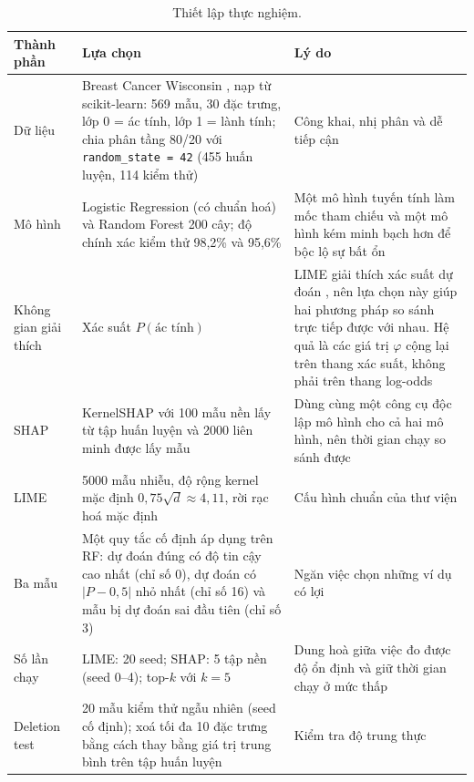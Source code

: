 \documentclass[11pt,a4paper]{article}
\newcommand{\code}[1]{\texttt{#1}}
\begin{document}
\begin{table}[!htb]
\centering\small
\caption{Thiết lập thực nghiệm.}\label{tab:setup}
\begin{tabularx}{\textwidth}{L{2.4cm}XL{3.8cm}}
\toprule
\textbf{Thành phần} & \textbf{Lựa chọn} & \textbf{Lý do}\\
\midrule
Dữ liệu & Breast Cancer Wisconsin \cite{street}, nạp từ scikit-learn: 569 mẫu, 30 đặc trưng, lớp 0 = ác tính, lớp 1 = lành tính; chia phân tầng 80/20 với \code{random\_state = 42} (455 huấn luyện, 114 kiểm thử) & Công khai, nhị phân và dễ tiếp cận\\
Mô hình & Logistic Regression (có chuẩn hoá) và Random Forest 200 cây; độ chính xác kiểm thử 98,2\% và 95,6\% & Một mô hình tuyến tính làm mốc tham chiếu và một mô hình kém minh bạch hơn để bộc lộ sự bất ổn\\
Không gian giải thích & Xác suất $P(\text{ác tính})$ & LIME giải thích xác suất dự đoán \cite{ribeiro}, nên lựa chọn này giúp hai phương pháp so sánh trực tiếp được với nhau. Hệ quả là các giá trị $\varphi$ cộng lại trên thang xác suất, không phải trên thang log-odds\\
SHAP & KernelSHAP \cite{lundberg} với 100 mẫu nền lấy từ tập huấn luyện và 2000 liên minh được lấy mẫu & Dùng cùng một công cụ độc lập mô hình cho cả hai mô hình, nên thời gian chạy so sánh được\\
LIME & 5000 mẫu nhiễu, độ rộng kernel mặc định $0{,}75\sqrt{d} \approx 4{,}11$, rời rạc hoá mặc định & Cấu hình chuẩn của thư viện\\
Ba mẫu & Một quy tắc cố định áp dụng trên RF: dự đoán đúng có độ tin cậy cao nhất (chỉ số 0), dự đoán có $|P - 0{,}5|$ nhỏ nhất (chỉ số 16) và mẫu bị dự đoán sai đầu tiên (chỉ số 3) & Ngăn việc chọn những ví dụ có lợi\\
Số lần chạy & LIME: 20 seed; SHAP: 5 tập nền (seed 0--4); top-$k$ với $k = 5$ & Dung hoà giữa việc đo được độ ổn định và giữ thời gian chạy ở mức thấp\\
Deletion test & 20 mẫu kiểm thử ngẫu nhiên (seed cố định); xoá tối đa 10 đặc trưng bằng cách thay bằng giá trị trung bình trên tập huấn luyện & Kiểm tra độ trung thực\\
\bottomrule
\end{tabularx}
\end{table}
\end{document}
